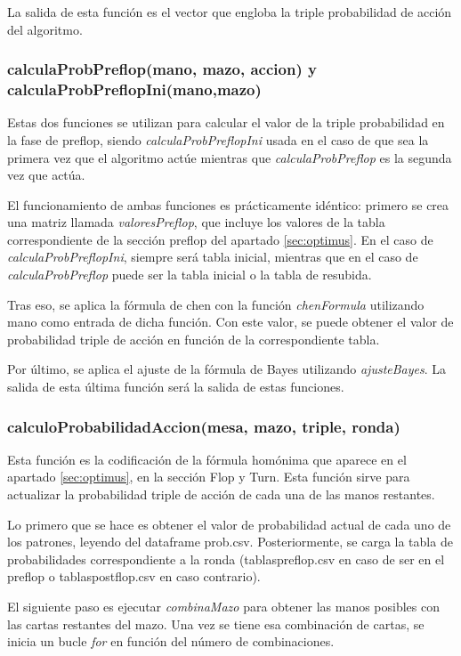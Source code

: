 La salida de esta función es el vector que engloba la triple probabilidad de acción del algoritmo.

\subsubsection{calculaProbPreflop(mano, mazo, accion) y calculaProbPreflopIni(mano,mazo)}

Estas dos funciones se utilizan para calcular el valor de la triple probabilidad en la fase de preflop, siendo \textit{calculaProbPreflopIni} usada en el caso de que sea la primera vez que el algoritmo actúe mientras que \textit{calculaProbPreflop} es la segunda vez que actúa.

El funcionamiento de ambas funciones es prácticamente idéntico: primero se crea una matriz llamada \textit{valoresPreflop}, que incluye los valores de la tabla correspondiente de la sección preflop del apartado  \ref{sec:optimus}. En el caso de \textit{calculaProbPreflopIni}, siempre será tabla inicial, mientras que en el caso de \textit{calculaProbPreflop} puede ser la tabla inicial o la tabla de resubida. 

Tras eso, se aplica la fórmula de chen con la función \textit{chenFormula} utilizando mano como entrada de dicha función. Con este valor, se puede obtener el valor de probabilidad triple de acción en función de la correspondiente tabla.

Por último, se aplica el ajuste de la fórmula de Bayes utilizando \textit{ajusteBayes}. La salida de esta última función será la salida de estas funciones.

\subsubsection{calculoProbabilidadAccion(mesa, mazo, triple, ronda)}

Esta función es la codificación de la fórmula homónima que aparece en el apartado  \ref{sec:optimus}, en la sección Flop y Turn. Esta función sirve para actualizar la probabilidad triple de acción de cada una de las manos restantes.

Lo primero que se hace es obtener el valor de probabilidad actual de cada uno de los patrones, leyendo del dataframe prob.csv. Posteriormente, se carga la tabla de probabilidades correspondiente a la ronda (tablaspreflop.csv en caso de ser en el preflop o tablaspostflop.csv en caso contrario). 

El siguiente paso es ejecutar \textit{combinaMazo} para obtener las manos posibles con las cartas restantes del mazo. Una vez se tiene esa combinación de cartas, se inicia un bucle \textit{for} en función del número de combinaciones.

